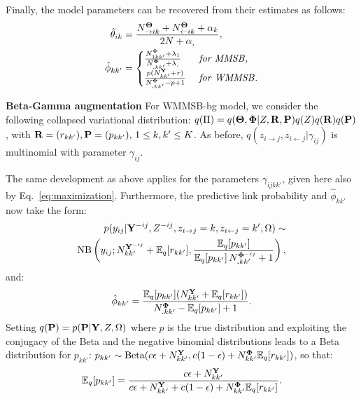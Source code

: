 Finally, the model parameters can be recovered from their estimates as follows:
%
\begin{align*}
\hat \theta_{ik} &= \frac{N^{{\Bs{\Theta}}}_{\rightarrow ik} + N^{{\Bs{\Theta}}}_{\leftarrow ik} + \alpha_k}{2N + \alpha_{\bm{.}}}, \\
\hat \phi_{kk'}&=\begin{cases}
     \frac{N^{{\Bs{\Phi}}}_{1 kk'} + \lambda_1}{N^{{\Bs{\Phi}}}_{\bm{.}kk'} + \lambda_{\bm{.}}} & \textrm{ \textit{for MMSB}}, \\
    \frac{p(N^{\B{Y}}_{kk'} + r)}{N^{{\Bs{\Phi}}}_{\bm{.}kk'} - p + 1}  & \textrm{ \textit{for WMMSB}}.  %
    \end{cases}
\end{align*}

\textbf{Beta-Gamma augmentation} For WMMSB-bg model, we consider the following collapsed variational distribution: $q(\Pi) = q({\boldsymbol{\Theta}}, {\boldsymbol{\Phi}}|Z, {\mathbf{R}}, {\mathbf{P}})q(Z)q({\mathbf{R}})q({\mathbf{P}})$,
with ${\mathbf{R}}=(r_{kk'}), {\mathbf{P}}=(p_{kk'}), \, 1 \le k,k' \le K$. As before, $q(z_{i \rightarrow j}, z_{i \leftarrow j}|\gamma_{ij})$ is multinomial with parameter $\gamma_{ij}$.

The same development as above applies for the parameters $\gamma_{ijkk'}$, given here also by Eq.~\ref{eq:maximization}. Furthermore, the predictive link probability and $\hat \phi_{kk'}$ now take the form:
%
\begin{align*}
p(y_{ij} | {\mathbf{Y}}^{-ij}, Z^{- ij}, z_{i\rightarrow j}=k, z_{i\leftarrow j}=k',\Omega) \sim \\
\mathrm{NB}\left(y_{ij}; N^{{\mathbf{Y}}^{-ij}}_{kk'} + \mathbb{E}_{q}[r_{kk'}], \frac{\mathbb{E}_{q}[p_{kk'}]}{\mathbb{E}_{q}[p_{kk'}]\,N^{{\boldsymbol{\Phi}}^{-ij}}_{\bm{.}kk'} + 1} \right),
\end{align*}
%
and:
%
\begin{align*}
\hat \phi_{kk'} = \frac{\mathbb{E}_{q}[p_{kk'}](N^{\mathbf{Y}}_{kk'} + \mathbb{E}_{q}[r_{kk'}])}{N^{{\boldsymbol{\Phi}}}_{\bm{.}kk'} - \mathbb{E}_{q}[p_{kk'}] + 1}.
\end{align*}
%
Setting $q({\mathbf{P}}) = p({\mathbf{P}}|{\mathbf{Y}},Z,\Omega)$ where $p$ is the true distribution and exploiting the conjugacy of the Beta and the negative binomial distributions leads to a Beta distribution for $p_{kk'}$: $p_{kk'} \sim \textrm{Beta}(c\epsilon + N^{\mathbf{Y}}_{kk'}, c(1-\epsilon) + N^{\boldsymbol{\Phi}}_{kk'}\mathbb{E}_{q}[r_{kk'}])$,
so that:
\[
\mathbb{E}_{q}[p_{kk'}] = \frac{c\epsilon + N^{\mathbf{Y}}_{kk'}}{c\epsilon + N^{\mathbf{Y}}_{kk'} + c(1-\epsilon) + N^{\boldsymbol{\Phi}}_{kk'}\mathbb{E}_{q}[r_{kk'}]}.
\]

